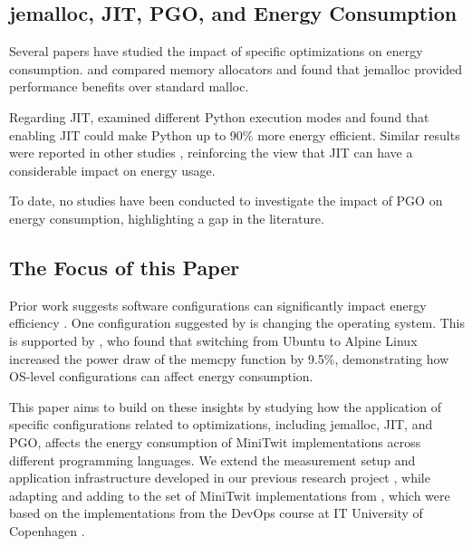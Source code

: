\documentclass[main.tex]{subfiles}
\begin{document}
\subsection{jemalloc, JIT, PGO, and Energy Consumption}

Several papers have studied the impact of specific optimizations on energy consumption. \textcite{Li_Wu_Kavi_Mehta_Yadwadkar_John_2023} and \textcite{Lamprakos_Papadopoulos_Catthoor_Soudris_2022} compared memory allocators and found that jemalloc provided performance benefits over standard malloc.

Regarding JIT, \textcite{Stoico_Dragomir_Lago_2025} examined different Python execution modes and found that enabling JIT could make Python up to 90\% more energy efficient. Similar results were reported in other studies \cite{Ournani_Belgaid_Rouvoy_Rust_Penhoat_2021, Hu_John_2006}, reinforcing the view that JIT can have a considerable impact on energy usage.

To date, no studies have been conducted to investigate the impact of PGO on energy consumption, highlighting a gap in the literature.

\subsection{The Focus of this Paper}

Prior work suggests software configurations can significantly impact energy efficiency \cite{Kempen_Kwon_Nguyen_Berger_2024, Pfeiffer_Offenberg_Pedersen_Landsgaard_Karlsen, Pfeiffer_Trindade_Meding_Harwick}. One configuration suggested by \textcite{Pfeiffer_Trindade_Meding_Harwick} is changing the operating system. This is supported by \textcite{Roque_Cruz_Durieux_2024}, who found that switching from Ubuntu to Alpine Linux increased the power draw of the memcpy function by 9.5\%, demonstrating how OS-level configurations can affect energy consumption.

This paper aims to build on these insights by studying how the application of specific configurations related to optimizations, including jemalloc, JIT, and PGO, affects the energy consumption of MiniTwit implementations across different programming languages. We extend the measurement setup and application infrastructure developed in our previous research project \cite{Pfeiffer_Offenberg_Pedersen_Landsgaard_Karlsen}, while adapting and adding to the set of MiniTwit implementations from \textcite{Pfeiffer_Trindade_Meding_Harwick}, which were based on the implementations from the DevOps course at IT University of Copenhagen \cite{devops-course}.
\end{document}
